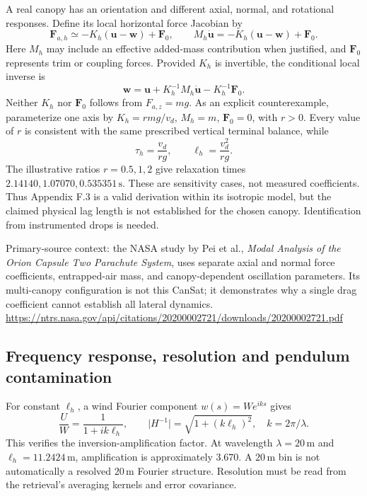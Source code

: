 \documentclass[11pt,a4paper]{article}
\numberwithin{equation}{section}
\begin{document}
A real canopy has an orientation and different axial, normal, and rotational
responses. Define its local horizontal force Jacobian by
\begin{equation}
 \boldsymbol F_{a,h}\simeq
 -K_h(\boldsymbol u-\boldsymbol w)+\boldsymbol F_0,
 \qquad
 M_h\dot{\boldsymbol u}
 =-K_h(\boldsymbol u-\boldsymbol w)+\boldsymbol F_0.
\end{equation}
Here $M_h$ may include an effective added-mass contribution when justified,
and $\boldsymbol F_0$ represents trim or coupling forces. Provided $K_h$ is
invertible, the conditional local inverse is
\begin{equation}
 \boldsymbol w=\boldsymbol u+K_h^{-1}M_h\dot{\boldsymbol u}
                            -K_h^{-1}\boldsymbol F_0.
\end{equation}
Neither $K_h$ nor $\boldsymbol F_0$ follows from $F_{a,z}=mg$.
As an explicit counterexample, parameterize one axis by
$K_h=rmg/v_d$, $M_h=m$, $\boldsymbol F_0=0$, with $r>0$.
Every value of $r$ is consistent with the same prescribed vertical
terminal balance, while
\begin{equation}
 \tau_h=\frac{v_d}{rg},\qquad \ell_h=\frac{v_d^2}{rg}.
\end{equation}
The illustrative ratios $r=0.5,1,2$ give relaxation times
$2.14140,1.07070,0.535351\,\mathrm s$. These are sensitivity cases, not
measured coefficients. Thus Appendix F.3 is a valid derivation within its
isotropic model, but the claimed physical lag length is not established for
the chosen canopy. Identification from instrumented drops is needed.

Primary-source context: the NASA study by Pei et al., \emph{Modal Analysis
of the Orion Capsule Two Parachute System}, uses separate axial and normal
force coefficients, entrapped-air mass, and canopy-dependent oscillation
parameters. Its multi-canopy configuration is not this CanSat; it demonstrates
why a single drag coefficient cannot establish all lateral dynamics.
\url{https://ntrs.nasa.gov/api/citations/20200002721/downloads/20200002721.pdf}

\subsection{Frequency response, resolution and pendulum contamination}

For constant $\ell_h$, a wind Fourier component $w(s)=W e^{iks}$ gives
\begin{equation}
 \frac{U}{W}=\frac{1}{1+ik\ell_h},\qquad
 \lvert H^{-1}\rvert=\sqrt{1+(k\ell_h)^2},\quad k=2\pi/\lambda.
\end{equation}
This verifies the inversion-amplification factor. At wavelength
$\lambda=20\,\mathrm m$ and $\ell_h=11.2424\,\mathrm m$, amplification
is approximately $3.670$. A $20\,\mathrm m$ bin is not automatically a
resolved $20\,\mathrm m$ Fourier structure. Resolution must be read from
the retrieval's averaging kernels and error covariance.
\end{document}
